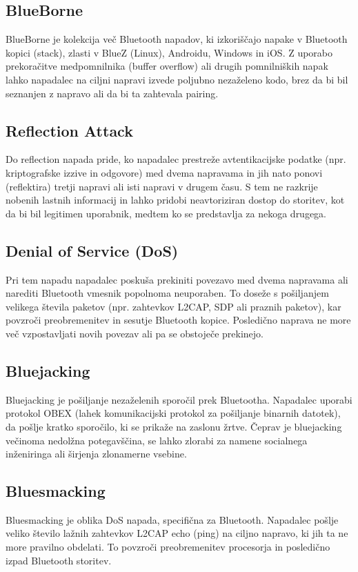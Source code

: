 \documentclass[11pt,a4paper,slovene]{article}
\begin{document}
\subsection{BlueBorne}
BlueBorne je kolekcija več Bluetooth napadov, ki izkoriščajo napake v Bluetooth kopici (stack), zlasti v BlueZ (Linux), Androidu, Windows in iOS. Z uporabo prekoračitve medpomnilnika (buffer overflow) ali drugih pomnilniških napak lahko napadalec na ciljni napravi izvede poljubno nezaželeno kodo, brez da bi bil seznanjen z napravo ali da bi ta zahtevala pairing.

\subsection{Reflection Attack}
Do reflection napada pride, ko napadalec prestreže avtentikacijske podatke (npr. kriptografske izzive in odgovore) med dvema napravama in jih nato ponovi (reflektira) tretji napravi ali isti napravi v drugem času. S tem ne razkrije nobenih lastnih informacij in lahko pridobi neavtoriziran dostop do storitev, kot da bi bil legitimen uporabnik, medtem ko se predstavlja za nekoga drugega.

\subsection{Denial of Service (DoS)}
Pri tem napadu napadalec poskuša prekiniti povezavo med dvema napravama ali narediti Bluetooth vmesnik popolnoma neuporaben. To doseže s pošiljanjem velikega števila paketov (npr. zahtevkov L2CAP, SDP ali praznih paketov), kar povzroči preobremenitev in sesutje Bluetooth kopice. Posledično naprava ne more več vzpostavljati novih povezav ali pa se obstoječe prekinejo.

\subsection{Bluejacking}
Bluejacking je pošiljanje nezaželenih sporočil prek Bluetootha. Napadalec uporabi protokol OBEX (lahek komunikacijski protokol za pošiljanje binarnih datotek), da pošlje kratko sporočilo, ki se prikaže na zaslonu žrtve. Čeprav je bluejacking večinoma nedolžna potegavščina, se lahko zlorabi za namene socialnega inženiringa ali širjenja zlonamerne vsebine.

\subsection{Bluesmacking}
Bluesmacking je oblika DoS napada, specifična za Bluetooth. Napadalec pošlje veliko število lažnih zahtevkov L2CAP echo (ping) na ciljno napravo, ki jih ta ne more pravilno obdelati. To povzroči preobremenitev procesorja in posledično izpad Bluetooth storitev.
\end{document}
